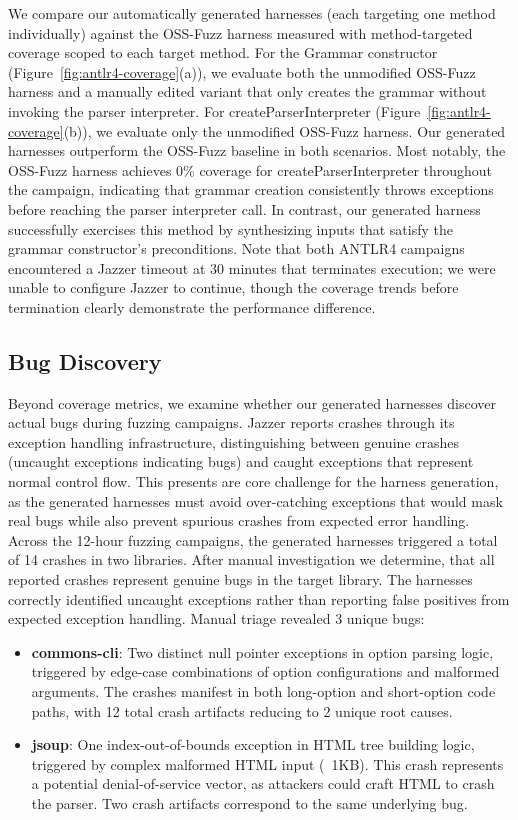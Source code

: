 We compare our automatically generated harnesses (each targeting one method individually) against the OSS-Fuzz harness measured with method-targeted coverage scoped to each target method. For the Grammar constructor (Figure~\ref{fig:antlr4-coverage}(a)), we evaluate both the unmodified OSS-Fuzz harness and a manually edited variant that only creates the grammar without invoking the parser interpreter. For createParserInterpreter (Figure~\ref{fig:antlr4-coverage}(b)), we evaluate only the unmodified OSS-Fuzz harness.
Our generated harnesses outperform the OSS-Fuzz baseline in both scenarios. Most notably, the OSS-Fuzz harness achieves 0\% coverage for createParserInterpreter throughout the campaign, indicating that grammar creation consistently throws exceptions before reaching the parser interpreter call. In contrast, our generated harness successfully exercises this method by synthesizing inputs that satisfy the grammar constructor's preconditions. Note that both ANTLR4 campaigns encountered a Jazzer timeout at 30 minutes that terminates execution; we were unable to configure Jazzer to continue, though the coverage trends before termination clearly demonstrate the performance difference.
%
\subsection{Bug Discovery}%
\label{subsec:bug-discovery}
Beyond coverage metrics, we examine whether our generated harnesses discover actual bugs during fuzzing campaigns. Jazzer reports crashes through its exception handling infrastructure, distinguishing between genuine crashes (uncaught exceptions indicating bugs) and caught exceptions that represent normal control flow. This presents are core challenge for the harness generation, as the generated harnesses must avoid over-catching exceptions that would mask real bugs while also prevent spurious crashes from expected error handling.
Across the 12-hour fuzzing campaigns, the generated harnesses triggered a total of 14 crashes in two libraries. After manual investigation we determine, that all reported crashes represent genuine bugs in the target library. The harnesses correctly identified uncaught exceptions rather than reporting false positives from expected exception handling. Manual triage revealed 3 unique bugs:

\begin{itemize}
\item \textbf{commons-cli}: Two distinct null pointer exceptions in option parsing logic, triggered by edge-case combinations of option configurations and malformed arguments. The crashes manifest in both long-option and short-option code paths, with 12 total crash artifacts reducing to 2 unique root causes.
\item \textbf{jsoup}: One index-out-of-bounds exception in HTML tree building logic, triggered by complex malformed HTML input (~1KB). This crash represents a potential denial-of-service vector, as attackers could craft HTML to crash the parser. Two crash artifacts correspond to the same underlying bug.
\end{itemize}

